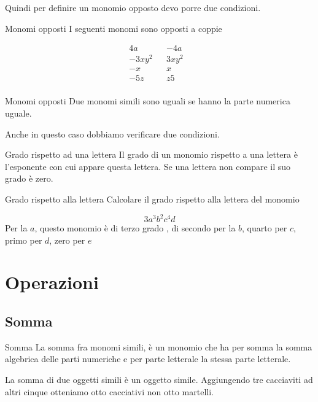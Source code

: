 Quindi per definire un monomio opposto devo porre due condizioni.
\begin{esempiot}{Monomi opposti}{}
	I seguenti monomi sono opposti a coppie
\end{esempiot}
\begin{align*}
	4a&&-4a&\\
	-3xy^2&&3xy^2&\\
	-x&&x&\\
	-5z&&z5\\
\end{align*}
\begin{definizionet}{Monomi opposti}{}
	Due monomi  simili sono uguali se hanno la parte numerica uguale.
\end{definizionet}
Anche in questo caso dobbiamo verificare due condizioni.
\begin{definizionet}{Grado rispetto ad una lettera}{}
Il grado di un monomio rispetto a una lettera è l'esponente con cui appare questa lettera. Se una lettera non compare il suo grado è zero.
\end{definizionet}
\begin{esempiot}{Grado rispetto alla lettera}{}
	Calcolare il grado rispetto alla lettera del monomio
\end{esempiot}
\[3a^3b^2c^4d\] Per la $a$, questo monomio è di terzo grado , di secondo per la $b$, quarto per $c$, primo per $d$, zero per $e$
\section{Operazioni}
\subsection{Somma}
\begin{definizionet}{Somma}{}
La somma fra monomi simili, è un monomio che ha per somma la somma algebrica delle parti numeriche e per parte letterale la stessa parte letterale.  
\end{definizionet}
La somma di due oggetti simili è un oggetto simile. Aggiungendo tre cacciaviti ad altri cinque  otteniamo otto cacciativi non otto martelli.
